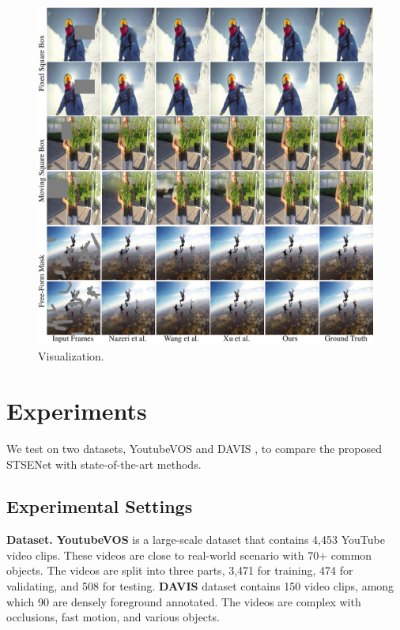 \begin{figure}[t]
	\centering
	\includegraphics[width=1.5\columnwidth]{viszong} %
	\caption{Visualization.}
	\label{viszong}
\end{figure}


\section{Experiments}


We test on two datasets, YoutubeVOS \cite{xu2018youtube} and DAVIS \cite{davis_2017}, to compare the proposed STSENet with state-of-the-art methods. %
\subsection{Experimental Settings}
\textbf{Dataset.} 
\textbf{YoutubeVOS} is a large-scale dataset that contains 4,453 YouTube video clips. These videos are close to real-world scenario with 70+ common objects. 
The videos are split into three parts, 3,471 for training, 474 for validating, and 508 for testing. 
\textbf{DAVIS} dataset contains 150 video clips, among which 90 are densely foreground annotated. 
The videos are complex with occlusions, fast motion, and various objects. 

